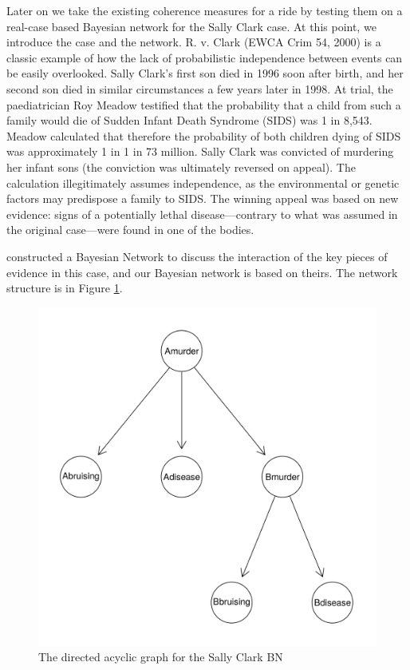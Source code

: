 \documentclass[10pt,]{scrartcl}
\begin{document}
Later on we take the existing coherence measures for a ride by testing them on a real-case based Bayesian network for the Sally Clark case. At this point, we introduce the case and the network.  R. v. Clark (EWCA Crim 54, 2000) is a classic  example of how the lack of probabilistic independence between events can be easily overlooked. Sally Clark's first son died in 1996 soon after birth, and her second son died in similar circumstances a few years later in 1998.  At trial, the paediatrician Roy Meadow testified that the probability that a child from such a  family would die of Sudden Infant Death Syndrome (SIDS) was 1 in 8,543.  Meadow calculated that therefore the probability of both children dying of SIDS was approximately 1 in  1 in 73 million. Sally Clark was convicted of murdering her  infant sons (the conviction was ultimately reversed on appeal). The calculation illegitimately assumes independence,  as the  environmental or genetic factors may predispose a family to SIDS. The winning appeal was based on new evidence: signs of a potentially lethal disease---contrary to what was assumed in the original case---were found in one of the bodies. 

\citet{Fenton2018Risk} constructed a Bayesian Network to discuss the interaction of the key pieces of evidence in this case, and our Bayesian network is based on theirs.  The network structure is in Figure \ref{fig:sc}.


\begin{figure}[H]
    \centering
    \includegraphics{SC.png}
    \caption{The directed acyclic graph for the Sally Clark BN}
    \label{fig:sc}
\end{figure}
\end{document}
